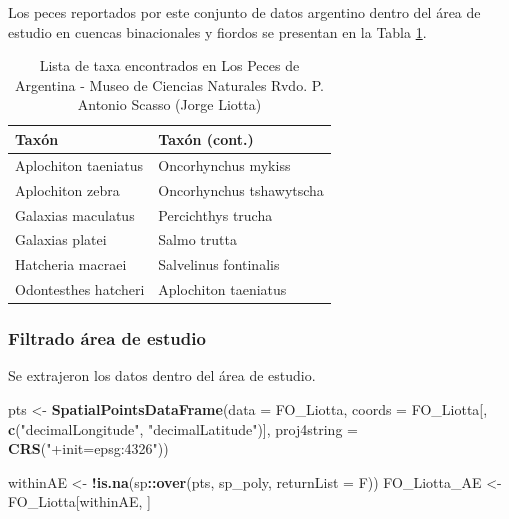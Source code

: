 \documentclass[sn-apa,pdflatex]{sn-jnl}
\newenvironment{Shaded}{\begin{snugshade}}{\end{snugshade}}
\newcommand{\AttributeTok}[1]{\textcolor[rgb]{0.13,0.29,0.53}{#1}}
\newcommand{\FunctionTok}[1]{\textcolor[rgb]{0.13,0.29,0.53}{\textbf{#1}}}
\newcommand{\NormalTok}[1]{#1}
\newcommand{\OtherTok}[1]{\textcolor[rgb]{0.56,0.35,0.01}{#1}}
\newcommand{\SpecialCharTok}[1]{\textcolor[rgb]{0.81,0.36,0.00}{\textbf{#1}}}
\newcommand{\StringTok}[1]{\textcolor[rgb]{0.31,0.60,0.02}{#1}}
\begin{document}
Los peces reportados por este conjunto de datos argentino dentro del
área de estudio en cuencas binacionales y fiordos se presentan en la
Tabla \ref{tab:DBLPAtaxa}.

\begingroup\fontsize{10}{12}\selectfont

\begin{longtable}[t]{>{\raggedright\arraybackslash}p{20em}>{\raggedright\arraybackslash}p{20em}}
\caption{\label{tab:DBLPAtaxa}Lista de taxa encontrados en Los Peces de Argentina - Museo de Ciencias Naturales Rvdo. P. Antonio Scasso (Jorge Liotta)}\\
\toprule
Taxón & Taxón (cont.)\\
\midrule
Aplochiton taeniatus & Oncorhynchus mykiss\\
Aplochiton zebra & Oncorhynchus tshawytscha\\
Galaxias maculatus & Percichthys trucha\\
Galaxias platei & Salmo trutta\\
Hatcheria macraei & Salvelinus fontinalis\\
\addlinespace
Odontesthes hatcheri & Aplochiton taeniatus\\
\bottomrule
\end{longtable}
\endgroup{}

\subsubsection{Filtrado área de
estudio}\label{filtrado-uxe1rea-de-estudio-8}

Se extrajeron los datos dentro del área de estudio.

\begin{Shaded}
\begin{Highlighting}[]
\NormalTok{pts }\OtherTok{\textless{}{-}} \FunctionTok{SpatialPointsDataFrame}\NormalTok{(}\AttributeTok{data =}\NormalTok{ FO\_Liotta, }\AttributeTok{coords =}\NormalTok{ FO\_Liotta[,}
    \FunctionTok{c}\NormalTok{(}\StringTok{"decimalLongitude"}\NormalTok{, }\StringTok{"decimalLatitude"}\NormalTok{)], }\AttributeTok{proj4string =} \FunctionTok{CRS}\NormalTok{(}\StringTok{"+init=epsg:4326"}\NormalTok{))}

\NormalTok{withinAE }\OtherTok{\textless{}{-}} \SpecialCharTok{!}\FunctionTok{is.na}\NormalTok{(sp}\SpecialCharTok{::}\FunctionTok{over}\NormalTok{(pts, sp\_poly, }\AttributeTok{returnList =}\NormalTok{ F))}
\NormalTok{FO\_Liotta\_AE }\OtherTok{\textless{}{-}}\NormalTok{ FO\_Liotta[withinAE, ]}
\end{Highlighting}
\end{Shaded}
\end{document}
